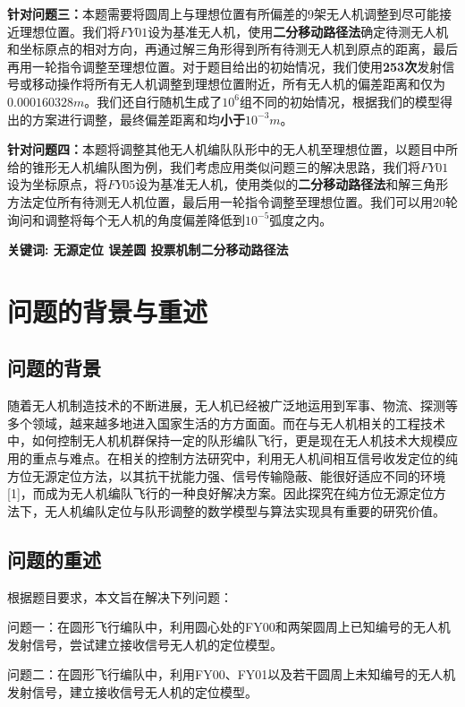 \documentclass{ctexart}
\begin{document}
\textbf{针对问题三：}\quad 本题需要将圆周上与理想位置有所偏差的9架无人机调整到尽可能接近理想位置。我们将$FY01$设为基准无人机，使用\textbf{二分移动路径法}确定待测无人机和坐标原点的相对方向，再通过解三角形得到所有待测无人机到原点的距离，最后再用一轮指令调整至理想位置。对于题目给出的初始情况，我们使用\textbf{253次}发射信号或移动操作将所有无人机调整到理想位置附近，所有无人机的偏差距离和仅为\textbf{$0.000160328m$}。我们还自行随机生成了$10^6$组不同的初始情况，根据我们的模型得出的方案进行调整，最终偏差距离和均\textbf{小于$10^{-3}m$}。

\textbf{针对问题四：}\quad 本题将调整其他无人机编队队形中的无人机至理想位置，以题目中所给的锥形无人机编队图为例，我们考虑应用类似问题三的解决思路，我们将$FY01$设为坐标原点，将$FY05$设为基准无人机，使用类似的\textbf{二分移动路径法}和解三角形方法定位所有待测无人机位置，最后用一轮指令调整至理想位置。我们可以用$20$轮询问和调整将每个无人机的角度偏差降低到$10^{-5}$弧度之内。


\quad

\textbf{关键词: \quad 无源定位 \quad 误差圆 \quad 投票机制\quad 二分移动路径法 }

\newpage
\section{问题的背景与重述}
\subsection{问题的背景}
随着无人机制造技术的不断进展，无人机已经被广泛地运用到军事、物流、探测等多个领域，越来越多地进入国家生活的方方面面。而在与无人机相关的工程技术中，如何控制无人机机群保持一定的队形编队飞行，更是现在无人机技术大规模应用的重点与难点。在相关的控制方法研究中，利用无人机间相互信号收发定位的纯方位无源定位方法，以其抗干扰能力强、信号传输隐蔽、能很好适应不同的环境[1]，而成为无人机编队飞行的一种良好解决方案。因此探究在纯方位无源定位方法下，无人机编队定位与队形调整的数学模型与算法实现具有重要的研究价值。

\subsection{问题的重述}
根据题目要求，本文旨在解决下列问题：

问题一：在圆形飞行编队中，利用圆心处的FY00和两架圆周上已知编号的无人机发射信号，尝试建立接收信号无人机的定位模型。

问题二：在圆形飞行编队中，利用FY00、FY01以及若干圆周上未知编号的无人机发射信号，建立接收信号无人机的定位模型。
\end{document}
